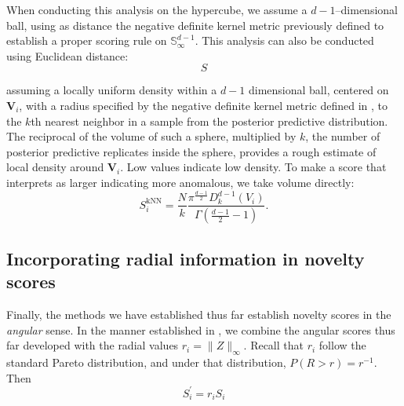When conducting this analysis on the hypercube, we assume a $d-1$--dimensional
  ball, using as distance the negative definite kernel metric previously defined
  to establish a proper scoring rule on $\mathbb{S}_{\infty}^{d-1}$.  This
  analysis can also be conducted using Euclidean distance:
  \[
    S  
  \]





  assuming a locally uniform density within a $d-1$ dimensional ball, centered 
  on $\bm{V}_i$, with a radius specified by the negative definite kernel metric 
  defined in \cite{trubey:pg}, to the $k$th nearest neighbor in a sample from 
  the posterior predictive distribution.  The reciprocal of the volume of such 
  a sphere, multiplied by $k$, the number of posterior predictive replicates 
  inside the sphere, provides a rough estimate of local density around 
  $\bm{V}_i$. Low values indicate low density. To make a score that interprets 
  as larger indicating more anomalous, we take volume directly:
  \begin{equation}
    \label{eqn:ad_knn}
    S_i^{\text{kNN}} = \frac{N}{k}
      \frac{\pi^{\frac{d-1}{2}}D_{k}^{d-1}(V_i)}{\Gamma\left(\frac{d-1}{2} - 1\right)}.
  \end{equation}









\subsection{Incorporating radial information in novelty scores}
Finally, the methods we have established thus far establish novelty scores in 
  the \emph{angular} sense.  In the manner established in \cite{goix2017}, we 
  combine the angular scores thus far developed with the radial values 
  $r_i = \lVert Z \rVert_{\infty}$.  Recall that $r_i$ follow the standard 
  Pareto distribution, and under that distribution, $P(R > r) = r^{-1}$.  Then
  \[
    S_i^{\prime} = r_iS_i
  \]



